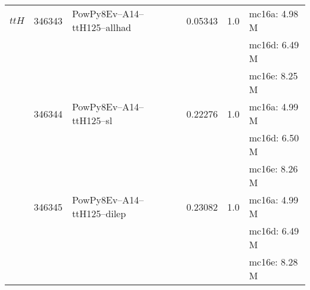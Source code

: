 \begin{center}
{\begin{xtabular}{lclS[round-mode=figures, round-precision=3]S[round-mode=places,  round-precision=2]l}
			
			
			
			
			
			
			
			 \midrule
			 $ttH$   & 346343 & PowPy8Ev--A14--ttH125--allhad            & 0.05343       & 1.0    & mc16a: 4.98 M   \\
			  & & & & & mc16d: 6.49 M \\
			  & & & & & mc16e: 8.25 M \\
			             & 346344 & PowPy8Ev--A14--ttH125--sl                  & 0.22276       & 1.0    & mc16a: 4.99 M   \\
			  & & & & & mc16d: 6.50 M \\
			  & & & & & mc16e: 8.26 M \\
			             & 346345 & PowPy8Ev--A14--ttH125--dilep             & 0.23082       & 1.0   & mc16a: 4.99 M   \\
			  & & & & & mc16d: 6.49 M \\
			  & & & & & mc16e: 8.28 M \\
			
			
			

\end{xtabular}}
\end{center}
